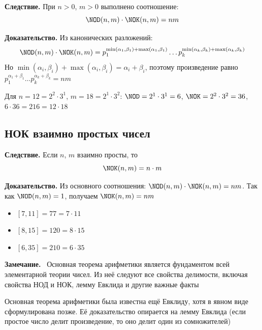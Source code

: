 \documentclass[a4paper,12pt]{article}
\newcommand{\myremark}{\textbf{Замечание.}\ }
\theoremstyle{definition}
\theoremstyle{plain}
\theoremstyle{remark}
\begin{document}
	\noindent \textbf{Следствие.}
	При $n > 0$, $m > 0$ выполнено соотношение:
	\[
	\NOD(n, m) \cdot \NOK(n, m) = n m
	\]
	
	\medskip
	\noindent \textbf{Доказательство.}
	Из канонических разложений:
	\[
	\NOD(n, m) \cdot \NOK(n, m) = p_1^{\min(\alpha_1,\beta_1) + \max(\alpha_1,\beta_1)} \dots p_k^{\min(\alpha_k,\beta_k) + \max(\alpha_k,\beta_k)}
	\]
	Но $\min(\alpha_i, \beta_i) + \max(\alpha_i, \beta_i) = \alpha_i + \beta_i$, поэтому произведение равно $p_1^{\alpha_1+\beta_1} \dots p_k^{\alpha_k+\beta_k} = n m$
	
	\begin{tcolorbox}[colback=gray!5, colframe=gray!50, title=Пример]
	Для $n=12=2^2\cdot 3^1$, $m=18=2^1\cdot 3^2$:
	$\NOD=2^1\cdot 3^1=6$, $\NOK=2^2\cdot 3^2=36$, $6\cdot 36=216=12\cdot 18$
	\end{tcolorbox}
	
	\subsection{НОК взаимно простых чисел}
	
	\noindent \textbf{Следствие.}
	Если $n$, $m$ взаимно просты, то
	\[
	\NOK(n, m) = n \cdot m
	\]
	
	\medskip
	\noindent \textbf{Доказательство.}
	Из основного соотношения: $\NOD(n, m) \cdot \NOK(n, m) = n m$. Так как $\NOD(n, m) = 1$, получаем $\NOK(n, m) = n m$
	
	\begin{tcolorbox}[colback=gray!5, colframe=gray!50, title=Примеры]
	\begin{itemize}
	\item $[7, 11] = 77 = 7 \cdot 11$
	\item $[8, 15] = 120 = 8 \cdot 15$
	\item $[6, 35] = 210 = 6 \cdot 35$
	\end{itemize}
	\end{tcolorbox}
	
	\myremark
	Основная теорема арифметики является фундаментом всей элементарной теории чисел. Из неё следуют все свойства делимости, включая свойства НОД и НОК, лемму Евклида и другие важные факты
	
	\begin{tcolorbox}[colback=purple!5, colframe=purple!50!black, title=Заметочка: История]
	Основная теорема арифметики была известна ещё Евклиду, хотя в явном виде сформулирована позже. Её доказательство опирается на лемму Евклида (если простое число делит произведение, то оно делит один из сомножителей)
	\end{tcolorbox}
	
\end{document}
